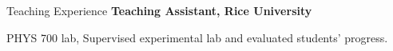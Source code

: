 \begin{rubric}{Teaching Experience}
%
\entry*[\hspace{1.05cm}2015]%
  \textbf{Teaching Assistant, Rice University}
  \par PHYS 700 lab, Supervised experimental lab and evaluated students' progress.
\end{rubric}

